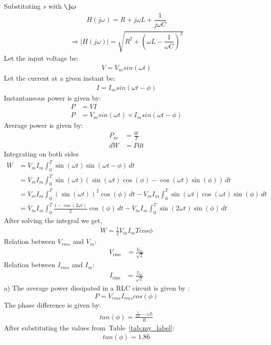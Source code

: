 \documentclass[journal,12pt,onecolumn]{IEEEtran}
\newcommand\tabref{Table~\ref}
\providecommand{\brak}[1]{\ensuremath{\left(#1\right)}}
\theoremstyle{remark}
\begin{document}
Substituting $s$ with $\j \omega$
\begin{align}
	H(j\omega) = R + j\omega L + \dfrac{1}{j\omega C}
\end{align}
\begin{align}
	\Rightarrow \lvert H(j\omega) \rvert = \sqrt{R^2 + \left(\omega L - \dfrac{1}{\omega C}\right)^2}
	\label{eq:1}
\end{align}
Let the input voltage be:
\begin{align}
	V=V_{m}sin\brak{\omega t}
\end{align}
Let the current at a given instant be:
\begin{align}
	I=I_{m}sin\brak{\omega t - \phi}
\end{align}
Instantaneous power is given by:
\begin{align}
	P &= VI\\
	P &= V_{m}sin\brak{\omega t} \times I_{m}sin\brak{\omega t - \phi}
\end{align}
Average power is given by:
\begin{align}
	P_{av} &= \frac{W}{T}\\
	dW &= Pdt
\end{align}
Integrating on both sides 
\begin{align}
	W &= V_{m}I_{m} \int_{0}^{T} \sin\brak{\omega t} \sin\brak{\omega t - \phi} \, dt \\
	&= V_{m}I_{m} \int_{0}^{T} \sin\brak{\omega t}\brak{\sin(\omega t)\cos(\phi) - \cos(\omega t)\sin(\phi)} \, dt \\
	&= V_{m}I_{m} \int_{0}^{T} (\sin(\omega t))^2\cos(\phi) \, dt - V_{m}I_{m} \int_{0}^{T} \sin(\omega t)\cos(\omega t)\sin(\phi) \, dt \\
	&= V_{m}I_{m} \int_{0}^{T} \frac{1 - \cos(2\omega t)}{2}\cos(\phi) \, dt - V_{m}I_{m} \int_{0}^{T} \sin(2\omega t)\sin(\phi) \, dt
\end{align}
After solving the integral we get,
\begin{align}
	W=\frac{1}{2}V_{m}I_{m}Tcos{\phi}
\end{align}
Relation between $V_{rms}$ and $V_m$:
\begin{align}
	V_{\text{rms}} &= \frac{V_{m}}{\sqrt{2}}
\end{align}	
Relation between $I_{rms}$ and $I_m$:
\begin{align}
	I_{\text{rms}} &= \frac{I_{m}}{\sqrt{2}}
\end{align}
a) The average power dissipated in a RLC circuit is given by :
\begin{equation}
	P=V_{rms} I_{rms} cos(\phi) 
	\label{eq:eq1}
\end{equation}
The phase difference is given by:
\begin{align}
	tan\brak{\phi} = \frac{\frac{1}{\omega C}-\omega L}{R}
\end{align}
After substituting the values from~\tabref{tab:my_label}:
\begin{align}
	tan\brak{\phi} = 1.86
\end{align}
\end{document}
